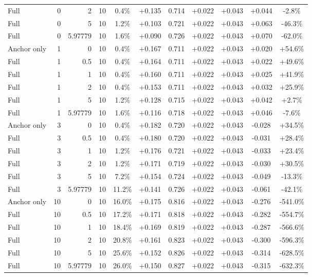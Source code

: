 \begin{table}[htbp]
\begin{tabular}{lrrrccccccc}
Full & 0 & 2 & 10 & 0.4\% & +0.135 & 0.714 & +0.022 & +0.043 & +0.044 & -2.8\% \\
Full & 0 & 5 & 10 & 1.2\% & +0.103 & 0.721 & +0.022 & +0.043 & +0.063 & -46.3\% \\
Full & 0 & 5.97779 & 10 & 1.6\% & +0.090 & 0.726 & +0.022 & +0.043 & +0.070 & -62.0\% \\
Anchor only & 1 & 0 & 10 & 0.4\% & +0.167 & 0.711 & +0.022 & +0.043 & +0.020 & +54.6\% \\
Full & 1 & 0.5 & 10 & 0.4\% & +0.164 & 0.711 & +0.022 & +0.043 & +0.022 & +49.6\% \\
Full & 1 & 1 & 10 & 0.4\% & +0.160 & 0.711 & +0.022 & +0.043 & +0.025 & +41.9\% \\
Full & 1 & 2 & 10 & 0.4\% & +0.153 & 0.711 & +0.022 & +0.043 & +0.032 & +25.9\% \\
Full & 1 & 5 & 10 & 1.2\% & +0.128 & 0.715 & +0.022 & +0.043 & +0.042 & +2.7\% \\
Full & 1 & 5.97779 & 10 & 1.6\% & +0.116 & 0.718 & +0.022 & +0.043 & +0.046 & -7.6\% \\
Anchor only & 3 & 0 & 10 & 0.4\% & +0.182 & 0.720 & +0.022 & +0.043 & -0.028 & +34.5\% \\
Full & 3 & 0.5 & 10 & 0.4\% & +0.180 & 0.720 & +0.022 & +0.043 & -0.031 & +28.4\% \\
Full & 3 & 1 & 10 & 1.2\% & +0.176 & 0.721 & +0.022 & +0.043 & -0.033 & +23.4\% \\
Full & 3 & 2 & 10 & 1.2\% & +0.171 & 0.719 & +0.022 & +0.043 & -0.030 & +30.5\% \\
Full & 3 & 5 & 10 & 7.2\% & +0.154 & 0.724 & +0.022 & +0.043 & -0.049 & -13.3\% \\
Full & 3 & 5.97779 & 10 & 11.2\% & +0.141 & 0.726 & +0.022 & +0.043 & -0.061 & -42.1\% \\
Anchor only & 10 & 0 & 10 & 16.0\% & +0.175 & 0.816 & +0.022 & +0.043 & -0.276 & -541.0\% \\
Full & 10 & 0.5 & 10 & 17.2\% & +0.171 & 0.818 & +0.022 & +0.043 & -0.282 & -554.7\% \\
Full & 10 & 1 & 10 & 18.4\% & +0.169 & 0.819 & +0.022 & +0.043 & -0.287 & -566.6\% \\
Full & 10 & 2 & 10 & 20.8\% & +0.161 & 0.823 & +0.022 & +0.043 & -0.300 & -596.3\% \\
Full & 10 & 5 & 10 & 25.6\% & +0.152 & 0.826 & +0.022 & +0.043 & -0.314 & -628.5\% \\
Full & 10 & 5.97779 & 10 & 26.0\% & +0.150 & 0.827 & +0.022 & +0.043 & -0.315 & -632.3\% \\

\end{tabular}
\end{table}
